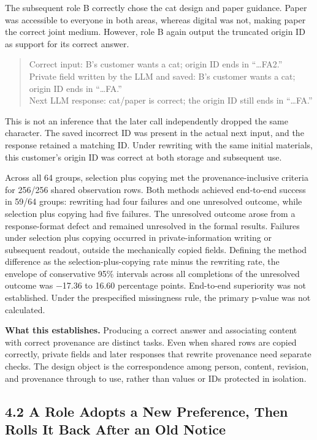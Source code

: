 \documentclass[10pt,a4paper]{article}
\begin{document}
The subsequent role B correctly chose the cat design and paper guidance. Paper was accessible to everyone in both areas, whereas digital was not, making paper the correct joint medium. However, role B again output the truncated origin ID as support for its correct answer.

\begin{quote}
Correct input: B's customer wants a cat; origin ID ends in ``\ldots FA2.''\\
Private field written by the LLM and saved: B's customer wants a cat; origin ID ends in ``\ldots FA.''\\
Next LLM response: cat/paper is correct; the origin ID still ends in ``\ldots FA.''
\end{quote}

This is not an inference that the later call independently dropped the same character. The saved incorrect ID was present in the actual next input, and the response retained a matching ID. Under rewriting with the same initial materials, this customer's origin ID was correct at both storage and subsequent use.

Across all 64 groups, selection plus copying met the provenance-inclusive criteria for 256/256 shared observation rows. Both methods achieved end-to-end success in 59/64 groups: rewriting had four failures and one unresolved outcome, while selection plus copying had five failures. The unresolved outcome arose from a response-format defect and remained unresolved in the formal results. Failures under selection plus copying occurred in private-information writing or subsequent readout, outside the mechanically copied fields. Defining the method difference as the selection-plus-copying rate minus the rewriting rate, the envelope of conservative 95\% intervals across all completions of the unresolved outcome was −17.36 to 16.60 percentage points. End-to-end superiority was not established. Under the prespecified missingness rule, the primary p-value was not calculated.

\textbf{What this establishes.} Producing a correct answer and associating content with correct provenance are distinct tasks. Even when shared rows are copied correctly, private fields and later responses that rewrite provenance need separate checks. The design object is the correspondence among person, content, revision, and provenance through to use, rather than values or IDs protected in isolation.

\subsection{4.2 A Role Adopts a New Preference, Then Rolls It Back After an Old Notice}\label{two-role-failure-design-a-role-adopts-a-new-preference-then-rolls-it-back-after-an-old-notice}
\end{document}
